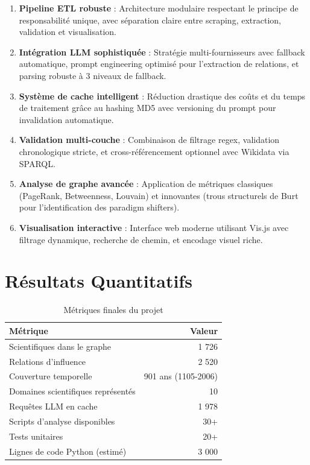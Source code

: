 \documentclass[12pt,a4paper]{report}
\begin{document}
\begin{enumerate}
    \item \textbf{Pipeline ETL robuste} : Architecture modulaire respectant le principe de responsabilité unique, avec séparation claire entre scraping, extraction, validation et visualisation.

    \item \textbf{Intégration LLM sophistiquée} : Stratégie multi-fournisseurs avec fallback automatique, prompt engineering optimisé pour l'extraction de relations, et parsing robuste à 3 niveaux de fallback.

    \item \textbf{Système de cache intelligent} : Réduction drastique des coûts et du temps de traitement grâce au hashing MD5 avec versioning du prompt pour invalidation automatique.

    \item \textbf{Validation multi-couche} : Combinaison de filtrage regex, validation chronologique stricte, et cross-référencement optionnel avec Wikidata via SPARQL.

    \item \textbf{Analyse de graphe avancée} : Application de métriques classiques (PageRank, Betweenness, Louvain) et innovantes (trous structurels de Burt pour l'identification des paradigm shifters).

    \item \textbf{Visualisation interactive} : Interface web moderne utilisant Vis.js avec filtrage dynamique, recherche de chemin, et encodage visuel riche.
\end{enumerate}

\section{Résultats Quantitatifs}

\begin{table}[H]
\centering
\begin{tabular}{|l|r|}
\hline
\rowcolor{ice500!20}
\textbf{Métrique} & \textbf{Valeur} \\
\hline
Scientifiques dans le graphe & 1 726 \\
\hline
Relations d'influence & 2 520 \\
\hline
Couverture temporelle & 901 ans (1105-2006) \\
\hline
Domaines scientifiques représentés & 10 \\
\hline
Requêtes LLM en cache & 1 978 \\
\hline
Scripts d'analyse disponibles & 30+ \\
\hline
Tests unitaires & 20+ \\
\hline
Lignes de code Python (estimé) & ~3 000 \\
\hline
\end{tabular}
\caption{Métriques finales du projet}
\end{table}
\end{document}
